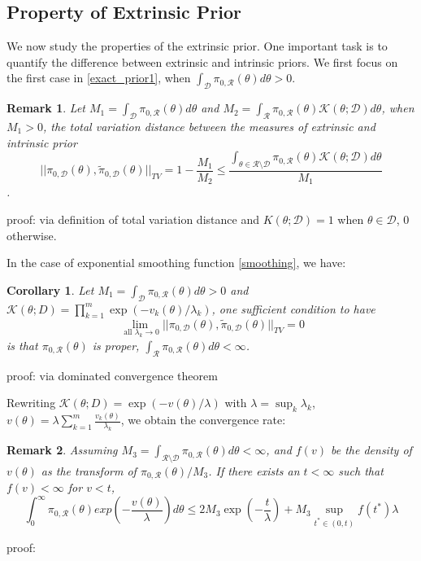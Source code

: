 \documentclass[10pt]{article}
\newtheorem{corollary}{Corollary}
\newtheorem{remark}{Remark}
\newcommand{\mc}[1]{\mathcal{#1}}
\DeclareMathOperator{\1}{\mathbbm{1}}
\begin{document}
\subsection{Property of Extrinsic Prior}

We now study the properties of the extrinsic prior. One important task is to quantify the difference between extrinsic and intrinsic priors. We first focus on the first case in \eqref{exact_prior1}, when $\int_{\mc D} \pi_{0,\mc R}(\theta)d\theta>0$.

\begin{remark}
Let $M_1= \int_{\mc D} \pi_{0,\mc R}(\theta)d\theta$ and $M_2 = \int_{\mc R} \pi_{0,\mc R}(\theta) \mc K(\theta;\mc D)d\theta$, when $M_1>0$, the total variation distance between the measures of extrinsic and intrinsic prior
$$||\pi_{0,\mc D}(\theta), \tilde{\pi}_{0,\mc D}(\theta) ||_{TV} = 1 - \frac{M_1}{M_2} \le \frac{\int_{\theta  \in \mc R \setminus \mc D} \pi_{0,\mc R}(\theta) \mc K(\theta;\mc D)d\theta}{M_1}$$.
\end{remark}
proof:
{via definition of total variation distance and $K(\theta;\mc D)=1$ when $\theta\in\mc D$, $0$ otherwise.}


In the case of exponential smoothing function \eqref{smoothing}, we have:
\begin{corollary}
Let $M_1= \int_{\mc D} \pi_{0,\mc R}(\theta)d\theta>0$ and $\mc K(\theta; D) = \prod_{k=1}^m \exp( -v_k(\theta)/\lambda_k)$, one sufficient condition to have
$$\lim_{\text{ all } \lambda_k\rightarrow 0}||\pi_{0,\mc D}(\theta), \tilde{\pi}_{0,\mc D}(\theta) ||_{TV} = 0$$
is that $\pi_{0,\mc R}(\theta)$ is proper, $\int_{\mc R} \pi_{0,\mc R}(\theta) d\theta<\infty$.
\end{corollary}
proof:
{via dominated convergence theorem}

Rewriting $\mc K(\theta; D) = \exp(-v(\theta)/\lambda)$ with $\lambda = \sup_k \lambda_k$, $v(\theta)=\lambda\sum_{k=1}^m\frac{ v_k(\theta)}{\lambda_k}$, we obtain the convergence rate:

\begin{remark}
Assuming $M_3= \int_{\mc R \setminus \mc D} \pi_{0,\mc R}(\theta) d\theta<\infty$, and $f(v)$ be the density of $v(\theta)$ as the transform of $\pi_{0,\mc R}(\theta)/M_3$. If there exists an $t<\infty$ such that $f(v) < \infty$ for $v<t$,
$$\int_0^\infty {\pi_{0,\mc R}(\theta)}exp(- \frac{v(\theta)}{\lambda}) d \theta \le 
2 {M_3} \exp(-\frac{t}{\lambda}) + {M_3} \sup_{t^*\in(0,t)} {f(t^*)}\lambda 
$$
\end{remark}
proof:
\end{document}
